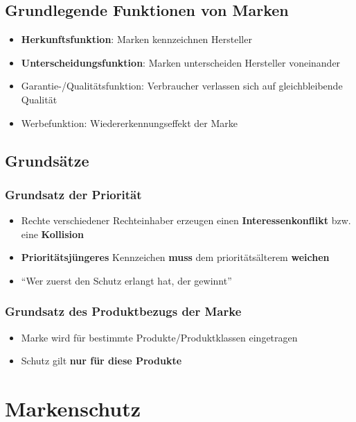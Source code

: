 \documentclass[12pt,A4]{extarticle}
\newcommand{\highlight}[1]{\textcolor{highlightColor}{\textbf{#1}}}
\begin{document}
\subsection{Grundlegende Funktionen von Marken}
\begin{itemize}
  \item{\highlight{Herkunftsfunktion}: Marken kennzeichnen Hersteller}
  \item{\highlight{Unterscheidungsfunktion}: Marken unterscheiden Hersteller voneinander}
  \item{Garantie-/Qualitätsfunktion: Verbraucher verlassen sich auf gleichbleibende Qualität}
  \item{Werbefunktion: Wiedererkennungseffekt der Marke}
\end{itemize}

\subsection{Grundsätze}
\subsubsection{Grundsatz der \highlight{Priorität}}
\begin{itemize}
  \item{Rechte verschiedener Rechteinhaber erzeugen einen \textbf{Interessenkonflikt} bzw. eine \textbf{Kollision}}
  \item{\textbf{Prioritätsjüngeres} Kennzeichen \textbf{muss} dem prioritätsälterem \textbf{weichen}}
  \item{``Wer zuerst den Schutz erlangt hat, der gewinnt''}
\end{itemize}

\subsubsection{Grundsatz des \highlight{Produktbezugs} der Marke}
\begin{itemize}
  \item{Marke wird für bestimmte Produkte/Produktklassen eingetragen}
  \item{Schutz gilt \textbf{nur für diese Produkte}}
\end{itemize}

\section{Markenschutz}
\end{document}

